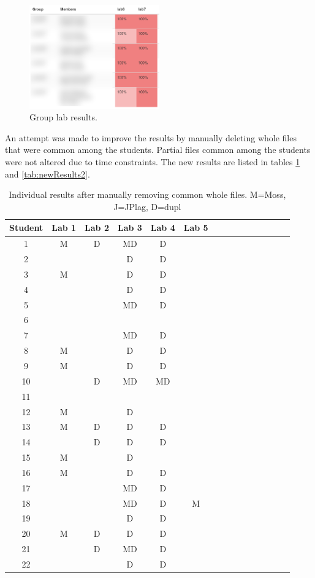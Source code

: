 \documentclass[10pt,journal,compsoc]{IEEEtran}
\begin{document}
		\begin{figure}[h!]
			\includegraphics[width=0.5\textwidth]{grouplabresults.png}
			\caption{Group lab results.}
			\label{fig:grouplabresults}
		\end{figure}
		
		An attempt was made to improve the results by manually deleting whole files that were common among the students. Partial files common among the students were not altered due to time constraints. The new results are listed in tables \ref{tab:newResults} and \ref{tab:newResults2}.
		
		\begin{table}[h!]
			\begin{center}
				\caption{Individual results after manually removing common whole files. M=Moss, J=JPlag, D=dupl}
				\label{tab:newResults}
				\begin{tabular}{ccccccccccccccc}
					\toprule
					Student & Lab 1 & Lab 2 & Lab 3 & Lab 4 & Lab 5\\
					\midrule
					1 & M & D & MD & D & \\
					2 &  &  & D & D & \\
					3 & M &  & D & D & \\
					4 &  &  & D & D & \\
					5 &  &  & MD & D & \\
					6 &  &  &  &  & \\
					7 &  &  & MD & D & \\
					8 & M &  & D & D & \\
					9 & M &  & D & D & \\
					10 &  & D & MD & MD & \\
					11 &  &  &  &  & \\
					12 & M &  & D &  & \\
					13 & M & D & D & D & \\
					14 &  & D & D & D & \\
					15 & M &  & D &  & \\
					16 & M &  & D & D & \\
					17 &  &  & MD & D & \\
					18 &  &  & MD & D & M\\
					19 &  &  & D & D & \\
					20 & M & D & D & D & \\
					21 &  & D & MD & D & \\
					22 &  &  & D & D & \\
					\bottomrule
				\end{tabular}
			\end{center}
		\end{table}
		
\end{document}
